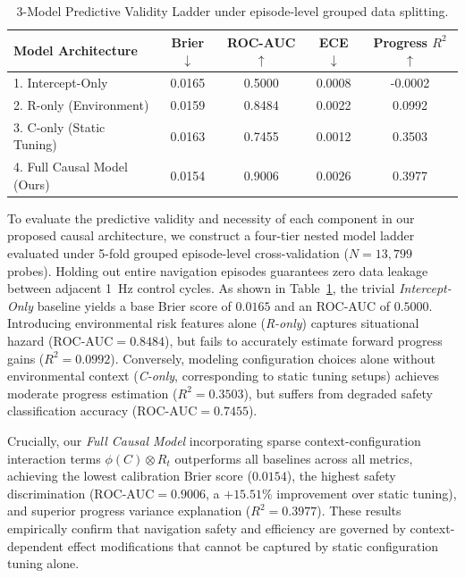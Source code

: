 
\begin{table}[t]
\centering
\caption{3-Model Predictive Validity Ladder under episode-level grouped data splitting.}
\label{tab:3model_ladder}
\footnotesize
\begin{tabularx}{\columnwidth}{@{}X c c c c@{}}
\toprule
\textbf{Model Architecture} & \textbf{Brier $\downarrow$} & \textbf{ROC-AUC $\uparrow$} & \textbf{ECE $\downarrow$} & \textbf{Progress $R^2$ $\uparrow$} \\
\midrule
1. Intercept-Only & 0.0165 & 0.5000 & 0.0008 & -0.0002 \\
2. R-only (Environment) & 0.0159 & 0.8484 & 0.0022 & 0.0992 \\
3. C-only (Static Tuning) & 0.0163 & 0.7455 & 0.0012 & 0.3503 \\
4. Full Causal Model (Ours) & 0.0154 & 0.9006 & 0.0026 & 0.3977 \\
\bottomrule
\end{tabularx}
\end{table}

To evaluate the predictive validity and necessity of each component in our proposed causal architecture, we construct a four-tier nested model ladder evaluated under 5-fold grouped episode-level cross-validation ($N=13,799$ probes). Holding out entire navigation episodes guarantees zero data leakage between adjacent 1~Hz control cycles. As shown in Table~\ref{tab:3model_ladder}, the trivial \textit{Intercept-Only} baseline yields a base Brier score of $0.0165$ and an ROC-AUC of $0.5000$. Introducing environmental risk features alone (\textit{R-only}) captures situational hazard ($\text{ROC-AUC} = 0.8484$), but fails to accurately estimate forward progress gains ($R^2 = 0.0992$). Conversely, modeling configuration choices alone without environmental context (\textit{C-only}, corresponding to static tuning setups) achieves moderate progress estimation ($R^2 = 0.3503$), but suffers from degraded safety classification accuracy ($\text{ROC-AUC} = 0.7455$).

Crucially, our \textit{Full Causal Model} incorporating sparse context-configuration interaction terms $\phi(C) \otimes R_t$ outperforms all baselines across all metrics, achieving the lowest calibration Brier score ($0.0154$), the highest safety discrimination ($\text{ROC-AUC} = 0.9006$, a $+15.51\%$ improvement over static tuning), and superior progress variance explanation ($R^2 = 0.3977$). These results empirically confirm that navigation safety and efficiency are governed by context-dependent effect modifications that cannot be captured by static configuration tuning alone.

